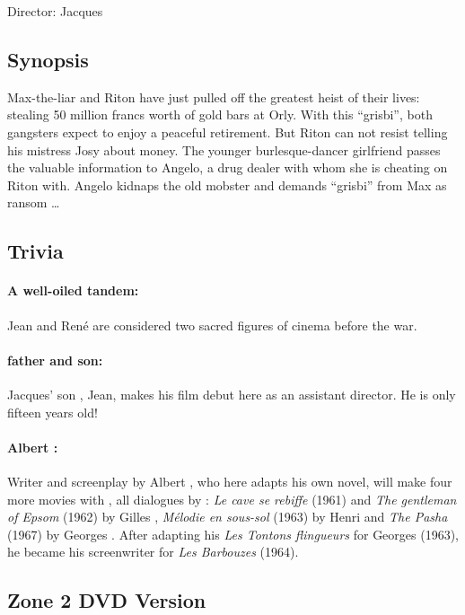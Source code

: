 Director: Jacques 

\subsection*{Synopsis}

Max-the-liar and Riton have just pulled off the greatest heist of their lives: stealing 50 million francs worth of gold bars at Orly. With this ``grisbi'', both gangsters expect to enjoy a peaceful retirement. But Riton can not resist telling his mistress Josy about money. The younger burlesque-dancer girlfriend passes the valuable information to Angelo, a drug dealer with whom she is cheating on Riton with. Angelo kidnaps the old mobster and demands ``grisbi'' from Max as ransom \dots{}

\subsection*{Trivia} 

\paragraph{A well-oiled tandem:} Jean  and René  are considered two sacred figures of cinema before the war.
\paragraph{ father and son:} Jacques' son , Jean, makes his film debut here as an assistant director. He is only fifteen years old!
\paragraph{Albert :} Writer and screenplay by Albert , who here adapts  his own novel, will make four more movies with , all dialogues by : \emph{Le cave se rebiffe} (1961) and \emph{The gentleman of Epsom} (1962) by Gilles , \emph{Mélodie en sous-sol} (1963) by Henri  and \emph{The Pasha} (1967) by Georges . After adapting his \emph{Les Tontons flingueurs} for Georges  (1963), he became his screenwriter for \emph{Les Barbouzes} (1964).

\subsection*{Zone 2 DVD Version}

